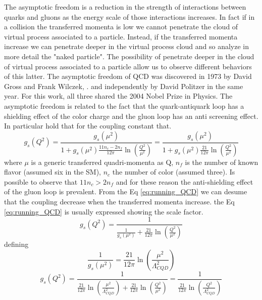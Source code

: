 \documentclass[12pt,a4paper]{book}
\begin{document}
	The asymptotic freedom is a reduction in the strength of interactions between quarks and gluons as the energy scale of those interactions increases. In fact if in a collision the transferred momenta is low we cannot penetrate the cloud of virtual process associated to a particle. Instead, if the transferred momenta increase we can penetrate deeper in the virtual process cloud and so analyze in more detail the "naked particle". The possibility of penetrate deeper in the cloud of virtual process associated to a particle allow us to observe different behaviors of this latter. The asymptotic freedom of QCD was discovered in 1973 by David Gross and Frank Wilczek, \cite{DAVIDPOLITZER1974129}. and independently by David Politzer in the same year. For this work, all three shared the 2004 Nobel Prize in Physics. The asymptotic freedom is related to the fact that the quark-antiquark loop has a shielding effect of the color charge and the gluon loop has an anti screening effect. In particular hold that for the coupling constant that.
	\begin{equation}
		g_s(Q^2)= \frac{g_s(\mu^2)}{1+g_s(\mu^2) \frac{11 n_c- 2n_f}{12\pi} \ln\left(\frac{Q^2}{\mu^2}\right)} = \frac{g_s(\mu^2)}{1+g_s(\mu^2) \frac{21}{12\pi} \ln\left(\frac{Q^2}{\mu^2}\right)}
		\label{eq:running_QCD}
	\end{equation}
	where $\mu$ is a generic transferred quadri-momenta as Q, $n_f$ is the number of known flavor (assumed six in the SM), $n_c$ the number of color (assumed three). Is possible to observe that $11n_c>2n_f$ and for these reason the anti-shielding effect of the gluon loop is prevalent. From the Eq \ref{eq:running_QCD} we can desume that the coupling decrease when the transferred momenta increase. the Eq \ref{eq:running_QCD} is usually expressed showing the scale factor. 
	\begin{equation}
		g_s(Q^2)= \frac{1}{\frac{1}{g_s(\mu^2)}+ \frac{21}{12\pi} \ln\left(\frac{Q^2}{\mu^2}\right)}
		\label{eq:running_QCD2}
	\end{equation} 
	defining 
	\begin{equation}
		\frac{1}{g_s(\mu^2)}= \frac{21}{12\pi} \ln\left(\frac{\mu^2}{\Lambda_{CQD}^2}\right)
	\end{equation} 
	\begin{equation}
		g_s(Q^2)=  \frac{1}{\frac{21}{12\pi} \ln\left(\frac{\mu^2}{\Lambda_{CQD}^2}\right)+ \frac{21}{12\pi} \ln\left(\frac{Q^2}{\mu^2}\right) }
		=\frac{1}{\frac{21}{12\pi} \ln \left(\frac{Q^2}{\Lambda_{CQD}^2}\right)}
		\label{eq:running_QCD_scale_factor}
	\end{equation} 
\end{document}
